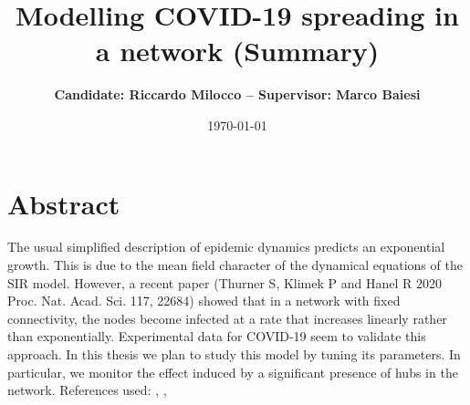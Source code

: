 \documentclass[11pt, a4paper, twoside]{article}
\title{\vspace{-2cm} \textbf{Modelling COVID-19 spreading in a network (Summary)}} %
\author{\vspace{2cm} \textbf{Candidate: Riccardo Milocco -- Supervisor: Marco Baiesi}}
\date{\vspace{-3em}\today}
\begin{document}
%

\maketitle
\section{Abstract}
The usual simplified description of epidemic dynamics predicts an exponential growth. This is due to the mean field character of the
dynamical equations of the SIR model. However, a recent paper (Thurner S, Klimek P and Hanel R 2020 Proc. Nat. Acad. Sci. 117, 22684) \cite{Thurner::NetBasedExpl} showed
that in a network with fixed connectivity, the nodes become infected at a rate that increases linearly rather than exponentially.
Experimental data for COVID-19 seem to validate this approach. In this thesis we plan to study this model by tuning its parameters.
In particular, we monitor the effect induced by a significant presence of hubs in the network.
References used: \cite{Ferguson::CapturingHumanBehaviour}, \cite{VespignaniSatorras2001Epidemic}, \cite{Thurner::NetBasedExpl}
\end{document}
